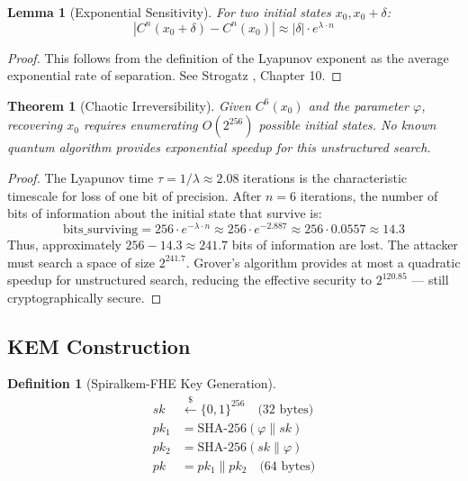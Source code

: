 \documentclass{article}
\newtheorem{theorem}{Theorem}[section]
\newtheorem{definition}{Definition}[section]
\newtheorem{lemma}{Lemma}[section]
\begin{document}
\begin{lemma}[Exponential Sensitivity]
For two initial states $x_0, x_0 + \delta$:
\begin{equation}
|C^n(x_0 + \delta) - C^n(x_0)| \approx |\delta| \cdot e^{\lambda \cdot n}
\label{eq:divergence}
\end{equation}
\end{lemma}

\begin{proof}
This follows from the definition of the Lyapunov exponent as the average exponential rate of separation. See Strogatz \cite{strogatz2018}, Chapter 10.
\end{proof}

\begin{theorem}[Chaotic Irreversibility]
Given $C^6(x_0)$ and the parameter $\varphi$, recovering $x_0$ requires enumerating $O(2^{256})$ possible initial states. No known quantum algorithm provides exponential speedup for this unstructured search.
\end{theorem}

\begin{proof}
The Lyapunov time $\tau = 1/\lambda \approx 2.08$ iterations is the characteristic timescale for loss of one bit of precision. After $n = 6$ iterations, the number of bits of information about the initial state that survive is:
\begin{equation}
\text{bits\_surviving} = 256 \cdot e^{-\lambda \cdot n} \approx 256 \cdot e^{-2.887} \approx 256 \cdot 0.0557 \approx 14.3
\end{equation}
Thus, approximately $256 - 14.3 \approx 241.7$ bits of information are lost. The attacker must search a space of size $2^{241.7}$. Grover's algorithm provides at most a quadratic speedup for unstructured search, reducing the effective security to $2^{120.85}$ — still cryptographically secure.
\end{proof}

\subsection{KEM Construction}

\begin{definition}[Spiralkem-FHE Key Generation]
\begin{align}
sk &\xleftarrow{\$} \{0,1\}^{256} \quad \text{(32 bytes)} \\
pk_1 &= \text{SHA-256}(\varphi \parallel sk) \\
pk_2 &= \text{SHA-256}(sk \parallel \varphi) \\
pk &= pk_1 \parallel pk_2 \quad \text{(64 bytes)}
\end{align}
\end{definition}
\end{document}
